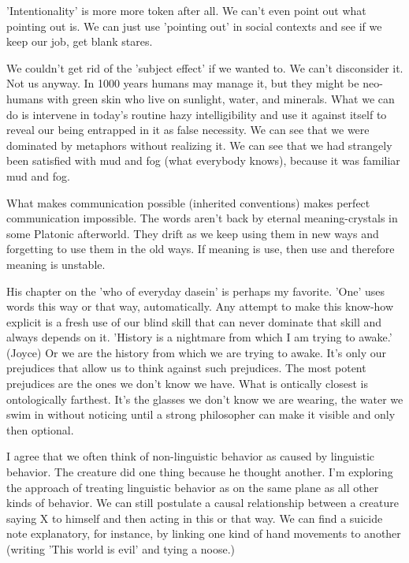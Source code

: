 \documentclass{article}
\begin{document}
'Intentionality' is more more token after all. We can't even point out what pointing out is. We can just use 'pointing out' in social contexts and see if we keep our job, get blank stares.
\newline

We couldn't get rid of the 'subject effect' if we wanted to. We can't disconsider it. Not us anyway. In 1000 years humans may manage it, but they might be neo-humans with green skin who live on sunlight, water, and minerals. What we can do is intervene in today's routine hazy intelligibility and use it against itself to reveal our being entrapped in it as false necessity. We can see that we were dominated by metaphors without realizing it. We can see that we had strangely been satisfied with mud and fog (what everybody knows), because it was familiar mud and fog.
\newline

What makes communication possible (inherited conventions) makes perfect communication impossible. The words aren't back by eternal meaning-crystals in some Platonic afterworld. They drift as we keep using them in new ways and forgetting to use them in the old ways. If meaning is use, then use and therefore meaning is unstable.
\newline

His chapter on the 'who of everyday dasein' is perhaps my favorite. 'One' uses words this way or that way, automatically. Any attempt to make this know-how explicit is a fresh use of our blind skill that can never dominate that skill and always depends on it. 'History is a nightmare from which I am trying to awake.' (Joyce) Or we are the history from which we are trying to awake. It's only our prejudices that allow us to think against such prejudices. The most potent prejudices are the ones we don't know we have. What is ontically closest is ontologically farthest. It's the glasses we don't know we are wearing, the water we swim in without noticing until a strong philosopher can make it visible and only then optional.
\newline

I agree that we often think of non-linguistic behavior as caused by linguistic behavior. The creature did one thing because he thought another. I'm exploring the approach of treating linguistic behavior as on the same plane as all other kinds of behavior. We can still postulate a causal relationship between a creature saying X to himself and then acting in this or that way. We can find a suicide note explanatory, for instance, by linking one kind of hand movements to another (writing 'This world is evil' and tying a noose.)
\newline
\end{document}
